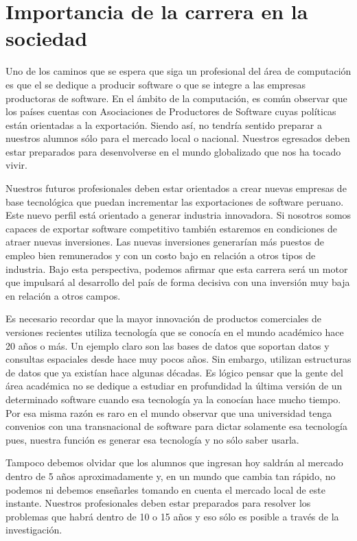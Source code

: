 \section{Importancia de la carrera en la sociedad}\label{sec:cs-importancia-en-la-sociedad}
Uno de los caminos que se espera que siga un profesional del área de computación es que el se dedique a producir software o que se integre a las empresas productoras de software. En el ámbito de la computación, es común observar que los países cuentas con Asociaciones de Productores de Software cuyas políticas están orientadas a la exportación. Siendo así, no tendría sentido preparar a nuestros alumnos sólo para el mercado local o nacional. Nuestros egresados deben estar preparados para desenvolverse en el mundo globalizado que nos ha tocado vivir.

Nuestros futuros profesionales deben estar orientados a crear nuevas empresas de base tecnológica que puedan incrementar las exportaciones de software peruano. Este nuevo perfil está orientado a generar industria innovadora. Si nosotros somos capaces de exportar software competitivo también estaremos en condiciones de atraer nuevas inversiones. Las nuevas inversiones generarían más puestos de empleo bien remunerados y con un costo bajo en relación a otros tipos de industria. Bajo esta perspectiva, podemos afirmar que esta carrera será un motor que impulsará al desarrollo del país de forma decisiva con una inversión muy baja en relación a otros campos.

Es necesario recordar que la mayor innovación de productos comerciales de versiones recientes utiliza tecnología que se conocía en el mundo académico hace 20 años o más. Un ejemplo claro son las bases de datos que soportan datos y consultas espaciales desde hace muy pocos años. Sin embargo, utilizan estructuras de datos que ya existían hace algunas décadas. Es lógico pensar que la gente del área académica no se dedique a estudiar en profundidad la última versión de un determinado software cuando esa tecnología ya la conocían hace mucho tiempo. Por esa misma razón es raro en el mundo observar que una universidad tenga convenios con una transnacional de software para dictar solamente esa tecnología pues, nuestra función es generar esa tecnología y no sólo saber usarla.

Tampoco debemos olvidar que los alumnos que ingresan hoy saldrán al mercado dentro de 5 años aproximadamente y, en un mundo que cambia tan rápido, no podemos ni debemos enseñarles tomando en cuenta el mercado local de este instante. Nuestros profesionales deben estar preparados para resolver los problemas que habrá dentro de 10 o 15 años y eso sólo es posible a través de la investigación.
